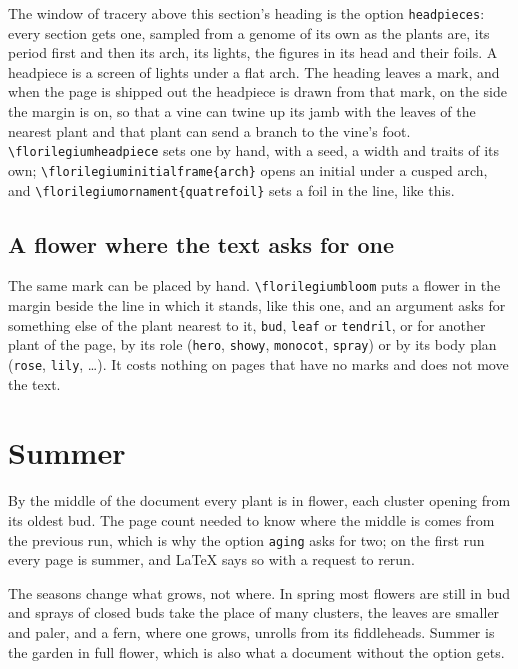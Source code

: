 \documentclass[11pt,a4paper]{article}
\newcommand\code[1]{\texttt{\small #1}}
\begin{document}
The window of tracery above this section's heading is the option \code{headpieces}: every
section gets one, sampled from a genome of its own as the plants are, its period first and
then its arch, its lights, the figures in its head and their foils. A headpiece is a screen
of lights under a flat arch. The heading leaves a mark, and when the page is shipped out the
headpiece is drawn from that mark, on the side the margin is on, so that a vine can twine up
its jamb with the leaves of the nearest plant and that plant can send a branch to the vine's
foot. \code{\textbackslash florilegiumheadpiece} sets one by hand, with a seed, a width and
traits of its own; \code{\textbackslash florilegiuminitialframe\{arch\}} opens an initial
under a cusped arch, and \code{\textbackslash florilegiumornament\{quatrefoil\}} sets a
foil in the line,  like this.

\subsection{A flower where the text asks for one}

The same mark can be placed by hand. \code{\textbackslash florilegiumbloom} puts a flower
in the margin beside the line in which it stands, like this
one\florilegiumbloom, and an argument asks for something else of the plant nearest to it,
\code{bud}, \code{leaf} or \code{tendril}, or for another plant of the page, by its role
(\code{hero}, \code{showy}, \code{monocot}, \code{spray}) or by its body plan
(\code{rose}, \code{lily}, \dots). It costs nothing on pages that have no marks and does
not move the text.

\section{Summer}

By the middle of the document every plant is in flower, each cluster opening from its oldest
bud. The page count needed to know where the
middle is comes from the previous run, which is why the option \code{aging} asks for two;
on the first run every page is summer, and LaTeX says so with a request to rerun.

The seasons change what grows, not where. In spring most flowers are still in bud and sprays
of closed buds take the place of many clusters, the leaves are smaller and paler, and a fern,
where one grows, unrolls from its fiddleheads. Summer is the garden in full flower, which is also what a
document without the option gets.
\end{document}
